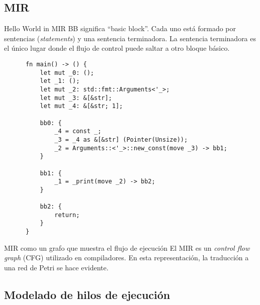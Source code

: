 \documentclass{beamer}
\begin{document}
\subsection{MIR}

\begin{frame}[fragile]{Hello World in MIR}
  \tiny
  BB significa ``basic block''. Cada uno está formado por sentencias (\emph{statements}) y una sentencia terminadora.
  La sentencia terminadora es el único lugar donde el flujo de control puede saltar a otro bloque básico.

  \begin{listing}
    \begin{verbatim}
      fn main() -> () {
          let mut _0: ();                     
          let _1: ();                         
          let mut _2: std::fmt::Arguments<'_>;
          let mut _3: &[&str];                
          let mut _4: &[&str; 1];             
      
          bb0: {
              _4 = const _;                    
              _3 = _4 as &[&str] (Pointer(Unsize));
              _2 = Arguments::<'_>::new_const(move _3) -> bb1;
          }
      
          bb1: {
              _1 = _print(move _2) -> bb2;
          }
      
          bb2: {
              return;
          }
      }      
    \end{verbatim}
  \end{listing}
\end{frame}

\begin{frame}{MIR como un grafo que muestra el flujo de ejecución}
  \scriptsize
  El MIR es un \emph{control flow graph} (CFG) utilizado en compiladores.
  En esta representación, la traducción a una red de Petri se hace evidente.

  \begin{figure}[!htb]
    \centering
    
  \end{figure}
\end{frame}

\subsection{Modelado de hilos de ejecución}
\end{document}
